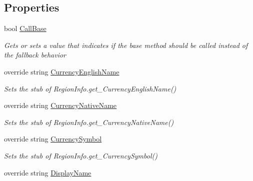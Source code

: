 \subsection*{Properties}
\begin{DoxyCompactItemize}
\item 
bool \hyperlink{class_system_1_1_globalization_1_1_fakes_1_1_stub_region_info_a81621b535f5662c94a9cd6bf975d5e5d}{Call\-Base}
\begin{DoxyCompactList}\small\item\em Gets or sets a value that indicates if the base method should be called instead of the fallback behavior\end{DoxyCompactList}\item 
override string \hyperlink{class_system_1_1_globalization_1_1_fakes_1_1_stub_region_info_a4f2235a2bf5a062ff28401e08380bd05}{Currency\-English\-Name}
\begin{DoxyCompactList}\small\item\em Sets the stub of Region\-Info.\-get\-\_\-\-Currency\-English\-Name()\end{DoxyCompactList}\item 
override string \hyperlink{class_system_1_1_globalization_1_1_fakes_1_1_stub_region_info_af684c1045d1c9ef5ed2e1ba82f23b414}{Currency\-Native\-Name}
\begin{DoxyCompactList}\small\item\em Sets the stub of Region\-Info.\-get\-\_\-\-Currency\-Native\-Name()\end{DoxyCompactList}\item 
override string \hyperlink{class_system_1_1_globalization_1_1_fakes_1_1_stub_region_info_a7b95bd8e7a2702502e8d14903a11c363}{Currency\-Symbol}
\begin{DoxyCompactList}\small\item\em Sets the stub of Region\-Info.\-get\-\_\-\-Currency\-Symbol()\end{DoxyCompactList}\item 
override string \hyperlink{class_system_1_1_globalization_1_1_fakes_1_1_stub_region_info_a1b219ee8d82dcf394af63e4cf738c7f8}{Display\-Name}

\end{DoxyCompactItemize}
